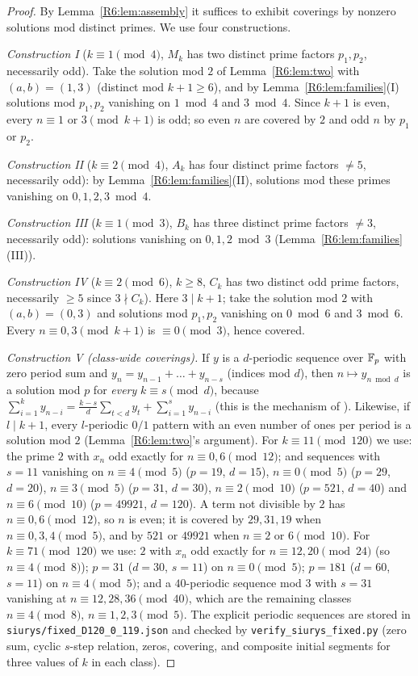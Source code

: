 \documentclass[11pt]{amsart}
\theoremstyle{definition}
\theoremstyle{remark}
\begin{document}
\begin{proof}
By Lemma~\ref{R6:lem:assembly} it suffices to exhibit coverings by nonzero solutions mod distinct
primes. We use four constructions.

\emph{Construction I} ($k\equiv1\pmod4$, $M_k$ has two distinct prime factors $p_1,p_2$, necessarily
odd). Take the solution mod $2$ of Lemma~\ref{R6:lem:two} with $(a,b)=(1,3)$ (distinct mod $k+1\ge6$),
and by Lemma~\ref{R6:lem:families}(I) solutions mod $p_1,p_2$ vanishing on $1\bmod4$ and $3\bmod4$.
Since $k+1$ is even, every $n\equiv1$ or $3\pmod{k+1}$ is odd; so even $n$ are covered by $2$ and
odd $n$ by $p_1$ or $p_2$.

\emph{Construction II} ($k\equiv2\pmod4$, $A_k$ has four distinct prime factors $\ne5$, necessarily
odd): by Lemma~\ref{R6:lem:families}(II), solutions mod these primes vanishing on $0,1,2,3\bmod4$.

\emph{Construction III} ($k\equiv1\pmod3$, $B_k$ has three distinct prime factors $\ne3$, necessarily
odd): solutions vanishing on $0,1,2\bmod3$ (Lemma~\ref{R6:lem:families}(III)).

\emph{Construction IV} ($k\equiv2\pmod6$, $k\ge8$, $C_k$ has two distinct odd prime factors,
necessarily $\ge5$ since $3\nmid C_k$). Here $3\mid k+1$; take the solution mod $2$ with $(a,b)=(0,3)$ and solutions mod $p_1,p_2$
vanishing on $0\bmod6$ and $3\bmod6$. Every $n\equiv0,3\pmod{k+1}$ is $\equiv0\pmod3$, hence covered.

\emph{Construction V (class-wide coverings).} If $y$ is a $d$-periodic sequence over $\mathbb{F}_p$
with zero period sum and $y_n=y_{n-1}+\dots+y_{n-s}$ (indices mod $d$), then $n\mapsto y_{n\bmod d}$
is a solution mod $p$ for \emph{every} $k\equiv s\pmod d$, because
$\sum_{i=1}^{k}y_{n-i}=\frac{k-s}{d}\sum_{t<d}y_t+\sum_{i=1}^{s}y_{n-i}$ (this is the mechanism of
\cite[Lemma~4.1]{R6-Siurys}). Likewise, if $l\mid k+1$, every $l$-periodic $0/1$ pattern with an even
number of ones per period is a solution mod $2$ (Lemma~\ref{R6:lem:two}'s argument). For
$k\equiv11\pmod{120}$ we use: the prime $2$ with $x_n$ odd exactly for $n\equiv0,6\pmod{12}$; and
sequences with $s=11$ vanishing on $n\equiv4\pmod5$ ($p=19$, $d=15$), $n\equiv0\pmod5$ ($p=29$,
$d=20$), $n\equiv3\pmod5$ ($p=31$, $d=30$), $n\equiv2\pmod{10}$ ($p=521$, $d=40$) and
$n\equiv6\pmod{10}$ ($p=49921$, $d=120$). A term not divisible by $2$ has $n\equiv0,6\pmod{12}$, so $n$ is even; it is
covered by $29,31,19$ when $n\equiv0,3,4\pmod5$, and by $521$ or $49921$ when $n\equiv2$ or
$6\pmod{10}$. For
$k\equiv71\pmod{120}$ we use: $2$ with $x_n$ odd exactly for $n\equiv12,20\pmod{24}$ (so $n\equiv4\pmod
8$); $p=31$ ($d=30$, $s=11$) on $n\equiv0\pmod5$; $p=181$ ($d=60$, $s=11$) on $n\equiv4\pmod5$; and a
$40$-periodic sequence mod $3$ with $s=31$ vanishing at $n\equiv12,28,36\pmod{40}$, which are the
remaining classes $n\equiv4\pmod8$, $n\equiv1,2,3\pmod5$. The explicit periodic sequences are stored
in \texttt{siurys/fixed\_\allowbreak{}D120\_\allowbreak{}0\_\allowbreak{}119.json} and checked by \texttt{verify\_\allowbreak{}siurys\_\allowbreak{}fixed.py} (zero sum,
cyclic $s$-step relation, zeros, covering, and composite initial segments for three values of $k$ in
each class).


\end{proof}
\end{document}
